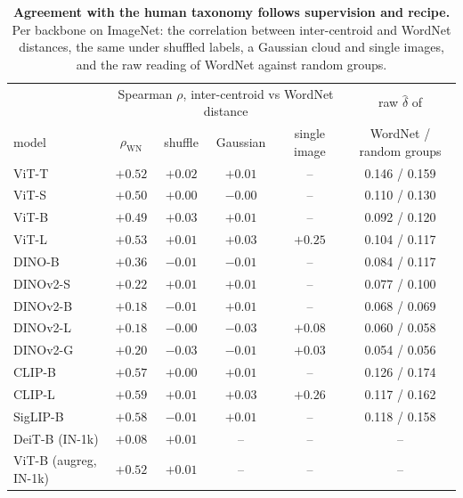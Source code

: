 \begin{table}[H]
\centering
\scriptsize
\setlength{\tabcolsep}{2.6pt}
\begingroup
\footnotesize
\setlength{\tabcolsep}{4pt}
\begin{tabular}{lcccc|c}
\toprule
 & \multicolumn{4}{c|}{Spearman $\rho$, inter-centroid vs WordNet distance} & raw $\hat\delta$ of \\
model & $\rho_{\text{WN}}$ & shuffle & Gaussian & single image & WordNet / random groups \\
\midrule
ViT-T & $+0.52$ & $+0.02$ & $+0.01$ & -- & 0.146 / 0.159 \\
ViT-S & $+0.50$ & $+0.00$ & $-0.00$ & -- & 0.110 / 0.130 \\
ViT-B & $+0.49$ & $+0.03$ & $+0.01$ & -- & 0.092 / 0.120 \\
ViT-L & $+0.53$ & $+0.01$ & $+0.03$ & $+0.25$ & 0.104 / 0.117 \\
\midrule
DINO-B & $+0.36$ & $-0.01$ & $-0.01$ & -- & 0.084 / 0.117 \\
DINOv2-S & $+0.22$ & $+0.01$ & $+0.01$ & -- & 0.077 / 0.100 \\
DINOv2-B & $+0.18$ & $-0.01$ & $+0.01$ & -- & 0.068 / 0.069 \\
DINOv2-L & $+0.18$ & $-0.00$ & $-0.03$ & $+0.08$ & 0.060 / 0.058 \\
DINOv2-G & $+0.20$ & $-0.03$ & $-0.01$ & $+0.03$ & 0.054 / 0.056 \\
\midrule
CLIP-B & $+0.57$ & $+0.00$ & $+0.01$ & -- & 0.126 / 0.174 \\
CLIP-L & $+0.59$ & $+0.01$ & $+0.03$ & $+0.26$ & 0.117 / 0.162 \\
SigLIP-B & $+0.58$ & $-0.01$ & $+0.01$ & -- & 0.118 / 0.158 \\
\midrule
DeiT-B (IN-1k) & $+0.08$ & $+0.01$ & -- & -- & -- \\
ViT-B (augreg, IN-1k) & $+0.52$ & $+0.01$ & -- & -- & -- \\
\bottomrule
\end{tabular}
\par\vspace{2pt}
\endgroup
\caption{\textbf{Agreement with the human taxonomy follows supervision and recipe.} Per backbone on ImageNet: the correlation between inter-centroid and WordNet distances, the same under shuffled labels, a Gaussian cloud and single images, and the raw reading of WordNet against random groups.
}
\label{tab:q7-wordnet}
\end{table}
